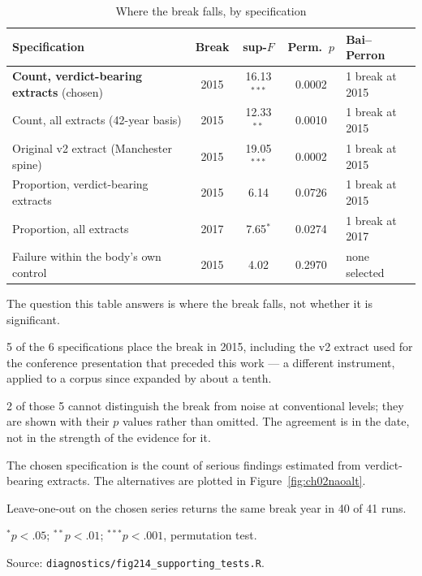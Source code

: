 \begin{table}[htbp]\centering
\begin{threeparttable}
\caption{Where the break falls, by specification}
\begin{tabular}{lcccl}
\toprule
Specification & Break & sup-$F$ & Perm.\ $p$ & Bai--Perron \\
\midrule
\textbf{Count, verdict-bearing extracts} (chosen) & 2015 & 16.13$^{***}$ & 0.0002 & 1 break at 2015 \\
Count, all extracts (42-year basis) & 2015 & 12.33$^{**}$ & 0.0010 & 1 break at 2015 \\
Original v2 extract (Manchester spine) & 2015 & 19.05$^{***}$ & 0.0002 & 1 break at 2015 \\
Proportion, verdict-bearing extracts & 2015 & 6.14 & 0.0726 & 1 break at 2015 \\
Proportion, all extracts & 2017 & 7.65$^{*}$ & 0.0274 & 1 break at 2017 \\
Failure within the body's own control & 2015 & 4.02 & 0.2970 & none selected \\
\bottomrule
\end{tabular}
\begin{tablenotes}[flushleft]\footnotesize
\item The question this table answers is where the break falls, not whether it is significant.
\item 5 of the 6 specifications place the break in 2015, including the v2 extract used for the
conference presentation that preceded this work --- a different instrument, applied to a corpus
since expanded by about a tenth.
\item 2 of those 5 cannot distinguish the break from noise at conventional levels; they are shown
with their $p$ values rather than omitted. The agreement is in the date, not in the strength of
the evidence for it.
\item The chosen specification is the count of serious findings estimated from verdict-bearing
extracts. The alternatives are plotted in Figure~\ref{fig:ch02naoalt}.
\item Leave-one-out on the chosen series returns the same break year in 40 of 41 runs.
\item $^{*}p<.05$; $^{**}p<.01$; $^{***}p<.001$, permutation test.
\item Source: \texttt{diagnostics/fig214\_supporting\_tests.R}.
\end{tablenotes}
\end{threeparttable}
\label{tab:ch02naobreaks}
\end{table}
